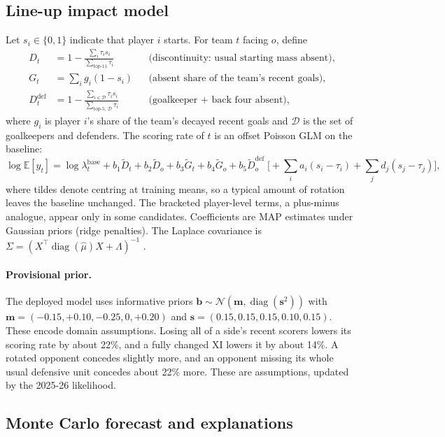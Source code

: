 \documentclass[11pt,a4paper]{article}
\newcommand{\Dt}{\tilde D}
\newcommand{\Gt}{\tilde G}
\begin{document}
\subsection{Line-up impact model}\label{sec:impact}

Let $s_i\in\{0,1\}$ indicate that player $i$ starts. For team $t$ facing $o$,
define
\begin{align}
  D_t &= 1-\frac{\sum_i\tau_i s_i}{\sum_{\text{top-}11}\tau_i}
  &&\text{(discontinuity: usual starting mass absent)},\\
  G_t &= \textstyle\sum_i g_i(1-s_i)
  &&\text{(absent share of the team's recent goals)},\\
  D^{\text{def}}_t &= 1-\frac{\sum_{i\in\mathcal D}\tau_i s_i}{\sum_{\text{top-}5,\,\mathcal D}\tau_i}
  &&\text{(goalkeeper + back four absent)},
\end{align}
where $g_i$ is player $i$'s share of the team's decayed recent goals and
$\mathcal D$ is the set of goalkeepers and defenders. The scoring rate of $t$
is an offset Poisson GLM on the baseline:
\begin{equation}
  \log\mathbb E[y_t] = \log\lambda^{\text{base}}_t
   + b_1\Dt_t + b_2\Dt_o + b_3\Gt_t + b_4\Gt_o + b_5\tilde D^{\text{def}}_o
   \;\Big[{}+\textstyle\sum_i a_i(s_i-\tau_i)+\sum_j d_j(s_j-\tau_j)\Big],
  \label{eq:impact}
\end{equation}
where tildes denote centring at training means, so a typical amount of rotation
leaves the baseline unchanged. The bracketed player-level terms, a plus-minus
analogue, appear only in some candidates. Coefficients are MAP estimates under
Gaussian priors (ridge penalties). The Laplace covariance is
$\Sigma=(X^\top\operatorname{diag}(\hat\mu)X+\Lambda)^{-1}$ \citep{tierney1986}.

\paragraph{Provisional prior.}
The deployed model uses informative priors
$\bm b\sim\mathcal N(\bm m,\operatorname{diag}(\bm s^2))$ with
$\bm m=(-0.15,+0.10,-0.25,0,+0.20)$ and $\bm s=(0.15,0.15,0.15,0.10,0.15)$.
These encode domain assumptions. Losing all of a side's recent scorers lowers
its scoring rate by about 22\%, and a fully changed XI lowers it by about 14\%.
A rotated opponent concedes slightly more, and an opponent missing its whole
usual defensive unit concedes about 22\% more. These are assumptions, updated
by the 2025-26 likelihood.

\subsection{Monte Carlo forecast and explanations}\label{sec:mc}
\end{document}
